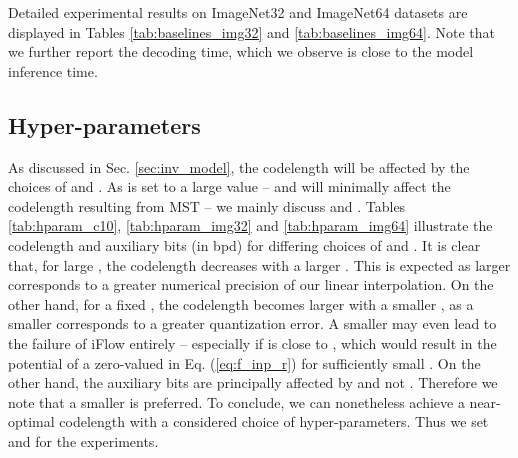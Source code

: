 \documentclass{article}
\begin{document}
Detailed experimental results on ImageNet32 and ImageNet64 datasets are displayed in Tables \ref{tab:baselines_img32} and \ref{tab:baselines_img64}. Note that we further report the decoding time, which we observe is close to the model inference time.

\subsection{Hyper-parameters}

As discussed in Sec. \ref{sec:inv_model}, the codelength will be affected by the choices of  and . As  is set to a large value -- and will minimally affect the codelength resulting from MST -- we mainly discuss  and . Tables \ref{tab:hparam_c10}, \ref{tab:hparam_img32} and \ref{tab:hparam_img64} illustrate the codelength and auxiliary bits (in bpd) for differing choices of  and . It is clear that, for large , the codelength decreases with a larger . This is expected as larger  corresponds to a greater numerical precision of our linear interpolation. On the other hand, for a fixed , the codelength becomes larger with a smaller , as a smaller  corresponds to a greater quantization error. A smaller  may even lead to the failure of iFlow entirely -- especially if  is close to , which would result in the potential of a zero-valued  in Eq. (\ref{eq:f_inp_r}) for sufficiently small . On the other hand, the auxiliary bits are principally affected by  and not . Therefore we note that a smaller  is preferred. To conclude, we can nonetheless achieve a near-optimal codelength with a considered choice of hyper-parameters. Thus we set  and  for the experiments.
\end{document}
